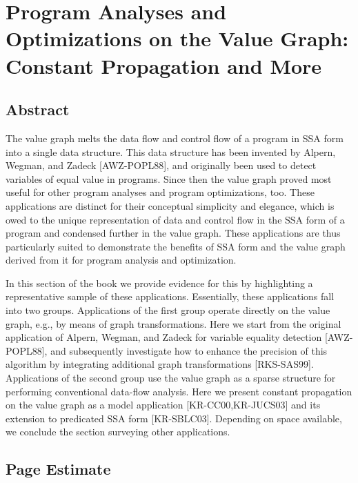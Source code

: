 
\chapter*{Program Analyses and Optimizations on the Value Graph: Constant Propagation and More}


\section{Abstract}

The value graph melts the data flow and control flow of a program in
SSA form into a single data structure. This data structure has been
invented by Alpern, Wegman, and Zadeck [AWZ-POPL88], and originally
been used to detect variables of equal value in programs. Since then
the value graph proved most useful for other program analyses and
program optimizations, too. These applications are distinct for their
conceptual simplicity and elegance, which is owed to the unique
representation of data and control flow in the SSA form of a program
and condensed further in the value graph. These applications are thus
particularly suited to demonstrate the benefits of SSA form and the
value graph derived from it for program analysis and optimization.

In this section of the book we provide evidence for this by
highlighting a representative sample of these
applications. Essentially, these applications fall into two
groups. Applications of the first group operate directly on the value
graph, e.g., by means of graph transformations. Here we start from the
original application of Alpern, Wegman, and Zadeck for variable
equality detection [AWZ-POPL88], and subsequently investigate how to
enhance the precision of this algorithm by integrating additional
graph transformations [RKS-SAS99]. Applications of the second group
use the value graph as a sparse structure for performing conventional
data-flow analysis. Here we present constant propagation on the value
graph as a model application [KR-CC00,KR-JUCS03] and its extension to
predicated SSA form [KR-SBLC03]. Depending on space available, we
conclude the section surveying other applications.



\section{Page Estimate}

